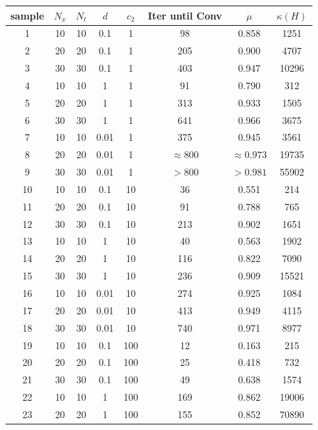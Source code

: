 \documentclass[../draft_1.tex]{subfiles}
\begin{document}
\begin{table}[]
	\centering
	\begin{tabular}{||c|c|c|c|c|c|c|c||}
		\toprule
		sample & $N_x$ & $N_t$ & $d$ & $c_2$ & Iter until Conv & $\mu$ & $\kappa(H)$  \\
		\bottomrule
		\toprule
		1 & 10 & 10 & 0.1 & 1 & 98 & 0.858 & 1251 \\ \hline
		2 & 20 & 20 & 0.1 & 1 & 205 & 0.900 & 4707 \\ \hline
		3 & 30 & 30 & 0.1 &  1 & 403 & 0.947 & 10296 \\ 
		\toprule
		4 & 10 & 10 & 1 & 1 & 91 & 0.790 & 312 \\ \hline
		5 & 20 & 20 & 1 & 1 & 313 & 0.933 & 1505 \\ \hline
		6 & 30 & 30 & 1 & 1 & 641 & 0.966 & 3675 \\ 
		\toprule
		7 & 10 & 10 & 0.01 & 1 & 375 & 0.945 & 3561 \\ \hline
		8 & 20 & 20 & 0.01 & 1 & $\approx 800$ & $\approx 0.973$ & 19735 \\ \hline
		9 & 30 & 30 & 0.01 & 1 & $>800$ & $>0.981$ & 55902 \\ 
		\bottomrule
		\toprule
		10 & 10 & 10 & 0.1 & 10 & 36 & 0.551 & 214 \\ \hline
		11 & 20 & 20 & 0.1 & 10 &  91 & 0.788 & 765 \\ \hline
	    12 & 30 & 30 & 0.1 &  10  & 213 & 0.902 & 1651 \\ 
		\toprule
		13 & 10 & 10 & 1 & 10 & 40 & 0.563 & 1902 \\ \hline
		14 & 20 & 20 & 1 & 10 & 116 & 0.822 & 7090 \\ \hline
		15 & 30 & 30 & 1 & 10 & 236 & 0.909 & 15521 \\ 
		\toprule
		16 & 10 & 10 & 0.01 & 10 &   274 & 0.925 & 1084 \\ \hline
		17 & 20 & 20 & 0.01 & 10 &  413 & 0.949 & 4115 \\ \hline
		18 & 30 & 30 & 0.01 & 10 & 740 & 0.971 & 8977 \\ 
		\bottomrule
	     \toprule
		19 & 10 & 10 & 0.1 & 100 & 12 & 0.163 & 215 \\ \hline
		20 & 20 & 20 & 0.1 & 100 & 25  & 0.418 & 732 \\ \hline
		21 & 30 & 30 & 0.1 &  100 &  49 & 0.638 & 1574 \\ 
		\toprule
		22 & 10 & 10 & 1 & 100 & 169 & 0.862 & 19006 \\ \hline
		23 & 20 & 20 & 1 & 100  & 155 & 0.852 & 70890\\ \hline

\end{tabular}
\end{table}
\end{document}
